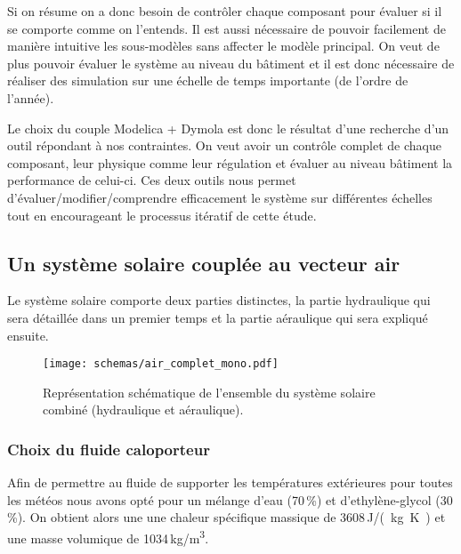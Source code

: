 Si on résume on a donc besoin de contrôler chaque composant pour évaluer si il se
comporte comme on l’entends. Il est aussi nécessaire de pouvoir facilement de manière
intuitive les sous-modèles sans affecter le modèle principal. On veut de plus pouvoir
évaluer le système au niveau du bâtiment et il est donc nécessaire de réaliser des
simulation sur une échelle de temps importante (de l’ordre de l’année).



Le choix du couple Modelica + Dymola est donc le résultat d’une recherche d’un outil
répondant à nos contraintes. On veut avoir un contrôle complet de chaque composant, leur
physique comme leur régulation et évaluer au niveau bâtiment la performance de celui-ci.
Ces deux outils nous permet d’évaluer/modifier/comprendre efficacement le système
sur différentes échelles tout en encourageant le processus itératif de cette étude.


\subsection{Un système solaire couplée au vecteur air} %
\label{sub:description_du_systeme_vecteur_air}
Le système solaire  comporte deux parties distinctes,
la partie hydraulique qui sera détaillée dans un premier temps et la partie
aéraulique qui sera expliqué ensuite.
\begin{figure}
    \begin{center}
        \texttt{[image: schemas/air\_complet\_mono.pdf]}
    \end{center}
    \caption{Représentation schématique de l’ensemble du système solaire combiné
             (hydraulique et aéraulique).
             \label{fig:air_complet_mono}}
\end{figure}

\subsubsection{Choix du fluide caloporteur} %
\label{ssub:choix_du_fluide_caloporteur}
Afin de permettre au fluide de supporter les températures extérieures pour toutes
les météos nous avons opté pour un mélange d’eau (70\,\%) et d’ethylène-glycol (30\,\%).
On obtient alors une une chaleur spécifique massique de 3608\,\si{J/(kg.K)} et une
masse volumique de 1034\,\si{kg/m^3}.

